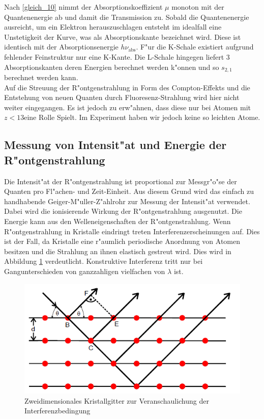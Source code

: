 		Nach \ref{gleich_10} nimmt der Absorptionskoeffizient $\mu$ monoton mit der Quantenenergie ab und damit die Transmission zu.
		Sobald die Quantenenergie ausreicht, um ein Elektron he\-raus\-zu\-schla\-gen entsteht im idealfall eine Unstetigkeit der Kurve, was als Absorptionskante bezeichnet wird.
		Diese ist identisch mit der Ab\-sorp\-tions\-e\-nergie $h\nu_\mathrm{abs}$.
		F"ur die K-Schale existiert aufgrund fehlender Feinstruktur nur eine K-Kante.
		Die L-Schale hingegen liefert 3 Ab\-sorp\-tions\-kan\-ten deren Energien berechnet werden k"onnen und so $s_{2,1}$ berechnet werden kann.\\
		Auf die Streuung der R"ontgenstrahlung in Form des Compton-Effekts und die Entstehung von neuen Quanten durch Fluoresenz-Strahlung wird hier nicht weiter eingegangen. Es ist jedoch zu erw"ahnen, dass diese nur bei Atomen mit $z < 13$eine Rolle Spielt.
		Im Experiment haben wir jedoch keine so leichten Atome.

	\subsection{Messung von Intensit"at und Energie der R"ontgenstrahlung} 
	\label{sub:messung_von_intensit_at_}
	
	Die Intensit"at der R"ontgenstrahlung ist proportional zur Messgr"o"se der Quanten pro Fl"achen- und Zeit-Einheit.
	Aus diesem Grund wird das einfach zu handhabende Geiger-M"uller-Z"ahlrohr zur Messung der Intensit"at verwendet. Dabei wird die ionisierende Wirkung der R"ontgenstrahlung ausgenutzt.
	Die Energie kann aus den Welleneigenschaften der R"ontgenstrahlung.
	Wenn R"ontgenstrahlung in Kristalle eindringt treten In\-ter\-fe\-renz\-er\-schei\-nung\-en auf.
	Dies ist der Fall, da Kristalle eine r"aumlich periodische Anordnung von Atomen besitzen und die Strahlung an ihnen elastisch gestreut wird. Dies wird in Abbildung \ref{interferenz} verdeutlicht. Konstruktive Interferenz tritt nur bei Gangunterschieden von ganzzahligen vielfachen von $\lambda$ ist.

	\begin{figure}[htbp]
		\centering
		\includegraphics[width = 12cm]{img/interferenz.PNG}
		\caption{Zweidimensionales Kristallgitter zur Veranschaulichung der Interferenzbedingung}
		\label{interferenz}
	\end{figure}


